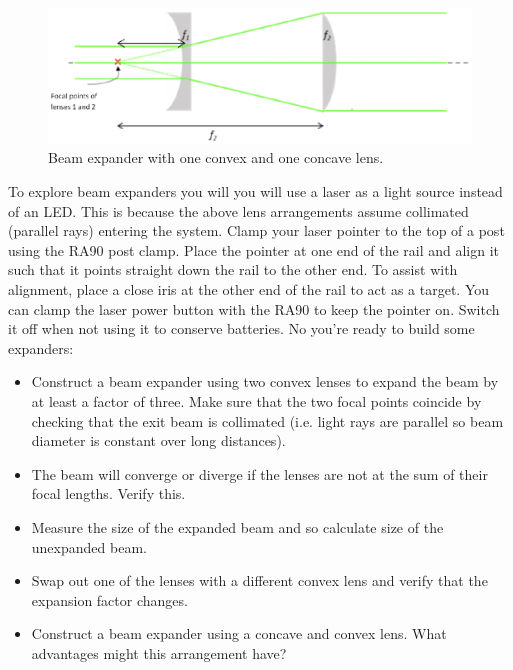 \documentclass[a4paper]{report}
\begin{document}
\begin{figure}[h]
\center
\includegraphics[width=4.5in]{beamExpander2.eps}
\caption{Beam expander with one convex and one concave lens.}
\label{beamExpander2}
\end{figure}

To explore beam expanders you will you will use a laser as a light source instead of an LED. 
This is because the above lens arrangements assume collimated (parallel rays) entering the system. 
Clamp your laser pointer to the top of a post using the RA90 post clamp. 
Place the pointer at one end of the rail and align it such that it points straight down the rail to the other end. 
To assist with alignment, place a close iris at the other end of the rail to act as a target.
You can clamp the laser power button with the RA90 to keep the pointer on. 
Switch it off when not using it to conserve batteries. 
No you're ready to build some expanders:

\begin{itemize}
\item Construct a beam expander using two convex lenses to expand the beam by at least a factor of three. 
Make sure that the two focal points coincide by checking that the exit beam is collimated
 (i.e. light rays are parallel so beam diameter is constant over long distances). 
\item The beam will converge or diverge if the lenses are not at the sum of their focal lengths. 
Verify this.
\item Measure the size of the expanded beam and so calculate size of the unexpanded beam.
\item Swap out one of the lenses with a different convex lens and verify that the expansion factor changes. 
\item Construct a beam expander using a concave and convex lens. What advantages might this arrangement have?
\end{itemize}
\end{document}
